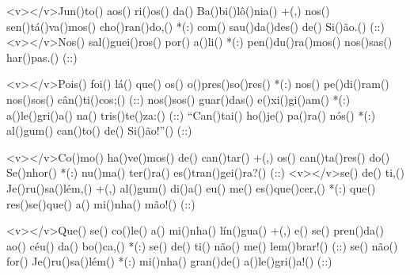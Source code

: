 <v></v>Jun()to() aos() ri()os() da() Ba()bi()lô()nia() +(,)
nos() sen()tá()va()mos() cho()ran()do,() *(:)
com() sau()da()des() de() Si()ão.() (::)
<v></v>Nos() sal()guei()ros() por() a()li() *(:)
pen()du()ra()mos() nos()sas() har()pas.() (::)

<v></v>Pois() foi() lá() que() os() o()pres()so()res() *(:)
nos() pe()di()ram() nos()sos() cân()ti()cos;() (::)
nos()sos() guar()das() e()xi()gi()am() *(:)
a()le()gri()a() na() tris()te()za:() (::)
``Can()tai() ho()je() pa()ra() nós() *(:)
al()gum() can()to() de() Si()ão!''() (::)

<v></v>Co()mo() ha()ve()mos() de() can()tar() +(,)
os() can()ta()res() do() Se()nhor() *(:)
nu()ma() ter()ra() es()tran()gei()ra?() (::)
<v></v>se() de() ti,() Je()ru()sa()lém,() +(,)
al()gum() di()a() eu() me() es()que()cer,() *(:)
que() res()se()que() a() mi()nha() mão!() (::)

<v></v>Que() se() co()le() a() mi()nha() lín()gua() +(,)
e() se() pren()da() ao() céu() da() bo()ca,() *(:)
se() de() ti() não() me() lem()brar!() (::)
se() não() for() Je()ru()sa()lém() *(:)
mi()nha() gran()de() a()le()gri()a!() (::)